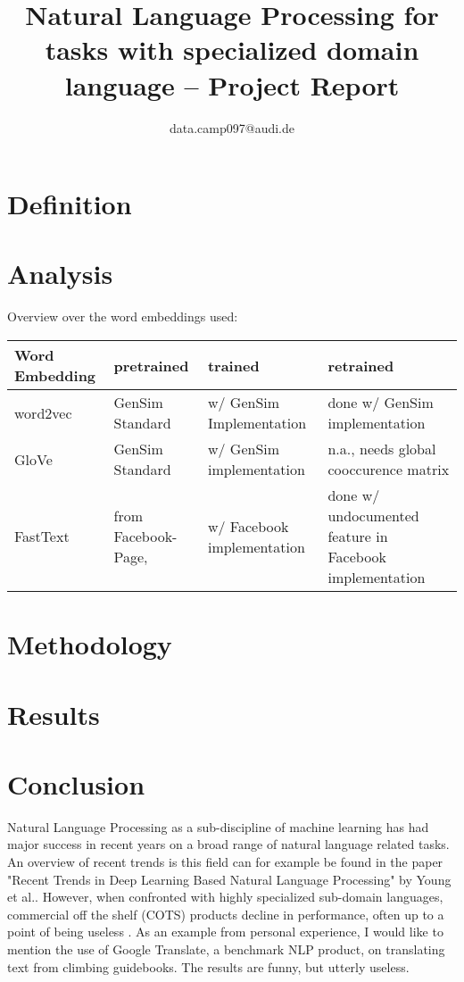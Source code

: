 \documentclass[10pt,a4paper]{article}
\begin{document}
	\title{Natural Language Processing for tasks with specialized domain language  --  Project Report}
	\author{data.camp097@audi.de}
	\maketitle
	
	\section{Definition}
	\section{Analysis}
	
	Overview over the word embeddings used:
	\begin{center}
		\begin{tabular}{|l|p{3cm}| p{3cm}| p{3cm}|}
			\hline
			\textbf{Word Embedding} & pretrained & trained & retrained \\ 
			\hline
			word2vec  & GenSim Standard & w/ GenSim Implementation & done w/ GenSim implementation \\  
			\hline
			GloVe & GenSim Standard &w/ GenSim implementation & n.a., needs global cooccurence matrix \\  
			\hline
			FastText & from Facebook-Page,  & w/ Facebook implementation & done w/ undocumented feature in Facebook implementation\\
			\hline
			 	
			
			
		\end{tabular}
	\end{center}
	\section{Methodology}
	\section{Results}
	\section{Conclusion}
	
	
	Natural Language Processing as a sub-discipline of machine learning has had major success in recent years on a broad range of natural language related tasks. An overview of recent trends is this field can for example be found in the paper \cite{1708.02709} "Recent Trends in Deep Learning Based Natural Language Processing" by Young et al.. 
	However, when confronted with highly specialized sub-domain languages, commercial off the shelf (COTS) products decline in performance, often up to a point of being useless \cite{OilandGas}. As an example from personal experience, I would like to mention the use of Google Translate, a benchmark NLP product, on translating text from climbing guidebooks. The results are funny, but utterly useless.
	
\end{document}
